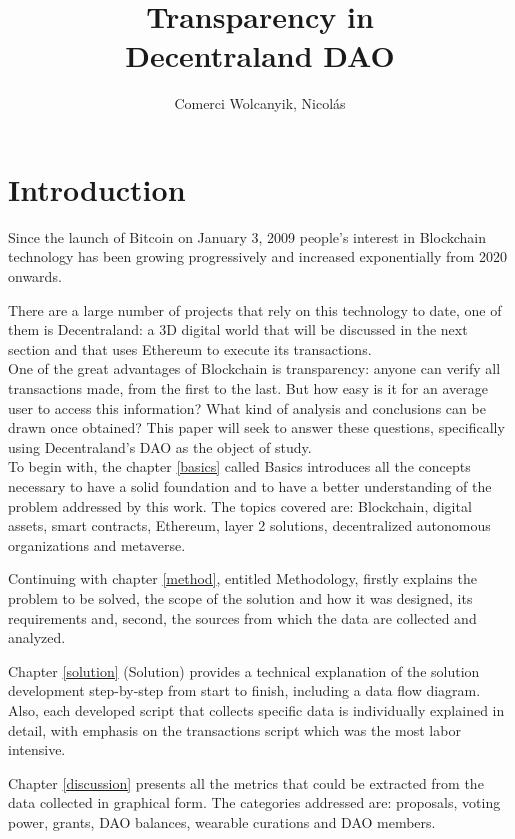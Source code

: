 \documentclass[MSE,Master,english]{twbook}%
\title{Transparency in\\Decentraland DAO}
\author{Comerci Wolcanyik, Nicol{\'a}s}
\begin{document}
\maketitle

%
%
\chapter{Introduction\label{intro}}
Since the launch of Bitcoin on January 3, 2009 people's interest in Blockchain technology has been growing progressively and increased exponentially from 2020 onwards. 

There are a large number of projects that rely on this technology to date, one of them is Decentraland: a 3D digital world that will be discussed in the next section and that uses Ethereum to execute its transactions. \\

One of the great advantages of Blockchain is transparency: anyone can verify all transactions made, from the first to the last. But how easy is it for an average user to access this information? What kind of analysis and conclusions can be drawn once obtained? This paper will seek to answer these questions, specifically using Decentraland's DAO as the object of study. \\

To begin with, the chapter \ref{basics} called Basics introduces all the concepts necessary to have a solid foundation and to have a better understanding of the problem addressed by this work. The topics covered are: Blockchain, digital assets, smart contracts, Ethereum, layer 2 solutions, decentralized autonomous organizations and metaverse.

Continuing with chapter \ref{method}, entitled Methodology, firstly explains the problem to be solved, the scope of the solution and how it was designed, its requirements and, second, the sources from which the data are collected and analyzed.

Chapter \ref{solution} (Solution) provides a technical explanation of the solution development step-by-step from start to finish, including a data flow diagram. Also, each developed script that collects specific data is individually explained in detail, with emphasis on the transactions script which was the most labor intensive.

Chapter \ref{discussion} presents all the metrics that could be extracted from the data collected in graphical form. The categories addressed are: proposals, voting power, grants, DAO balances, wearable curations and DAO members.
\end{document}
